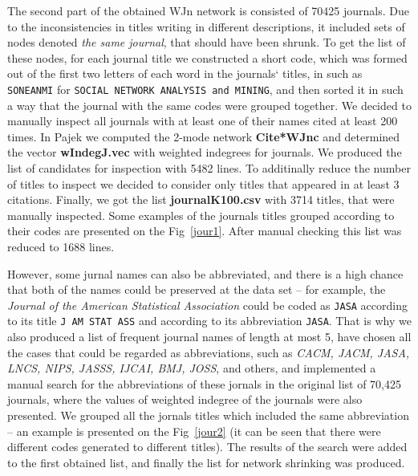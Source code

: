\documentclass[11pt]{article} %
\begin{document}
The second part of the obtained WJn network is consisted of 70425 journals. Due to the inconsistencies in titles writing in different descriptions, it included sets of nodes denoted \textit{the same journal}, that should have been shrunk. To get the list of these nodes, for each journal title we constructed a short code, which was formed out of the first two letters of each word in the journals` titles, in such as \texttt{SONEANMI} for \texttt{SOCIAL NETWORK ANALYSIS and MINING}, and then sorted it in such a way that the journal with the same codes were grouped together. We decided to manually inspect all journals with at least one of their names cited at least 200 times. In Pajek we computed the 2-mode network \textbf{Cite*WJnc} and determined the vector \textbf{wIndegJ.vec} with weighted indegrees for journals. We produced the list of candidates for inspection with 5482 lines. To additinally reduce the number of titles to inspect we decided to consider only titles that appeared in at least 3 citations. Finally, we got the list \textbf{journalK100.csv} with 3714 titles, that were manually inspected. Some examples of the journals titles grouped according to their codes are presented on the Fig~\ref{jour1}. After manual checking this list was reduced to 1688 lines. \medskip 

However, some jurnal names can also be abbreviated, and there is a high chance that both of the names could be preserved at the data set -- for example, the \textit{Journal of the American Statistical Association} could be coded as \texttt{JASA} according to its title \texttt{J AM  STAT ASS} and according to its abbreviation \texttt{JASA}. That is why we also produced a list of frequent journal names of length at most 5, have chosen all the cases that could be regarded as abbreviations, such as \textit{CACM, JACM, JASA, LNCS, NIPS, JASSS, IJCAI, BMJ, JOSS}, and others, and implemented a manual search for the abbreviations of these jornals in the original list of 70,425 journals, where the values of weighted indegree of the journals were also presented. We grouped all the jornals titles which included the same abbreviation -- an example  is presented on the Fig~\ref{jour2} (it can be seen that there were different codes generated to different titles). The results of the search were added to the first obtained list, and finally the list for network shrinking was produced.  \medskip 
\end{document}
